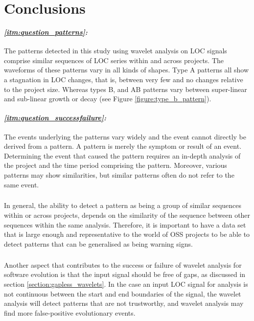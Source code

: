 \chapter{Conclusions}
\label{conclusions}

\subsubsection{\textit{\ref{itm:question_patterns}: \subQuestionOne}}
The patterns detected in this study using wavelet analysis on LOC signals
comprise similar sequences of LOC series within and across projects. The
waveforms of these patterns vary in all kinds of shapes. Type A patterns all
show a stagnation in LOC changes, that is, between very few and no changes
relative to the project size. Whereas types B, and AB patterns vary between
super-linear and sub-linear growth or decay (see Figure
\ref{figure:type_b_pattern}).

\subsubsection{\textit{\ref{itm:question_successfailure}: \subQuestionTwo}}
The events underlying the patterns vary widely and the event cannot directly be
derived from a pattern. A pattern is merely the symptom or result of an event.
Determining the event that caused the pattern requires an in-depth analysis of
the project and the time period comprising the pattern. Moreover, various
patterns may show similarities, but similar patterns often do not refer to the
same event.

\paragraph{}
In general, the ability to detect a pattern as being a group of similar
sequences within or across projects, depends on the similarity of the sequence
between other sequences within the same analysis. Therefore, it is important to
have a data set that is large enough and representative to the world of OSS
projects to be able to detect patterns that can be generalised as being warning
signs.

\paragraph{}
Another aspect that contributes to the success or failure of wavelet analysis
for software evolution is that the input signal should be free of gaps, as
discussed in section \ref{section:gapless_wavelets}. In the case an input LOC
signal for analysis is not continuous between the start and end boundaries of
the signal, the wavelet analysis will detect patterns that are not trustworthy,
and wavelet analysis may find more false-positive evolutionary events.

